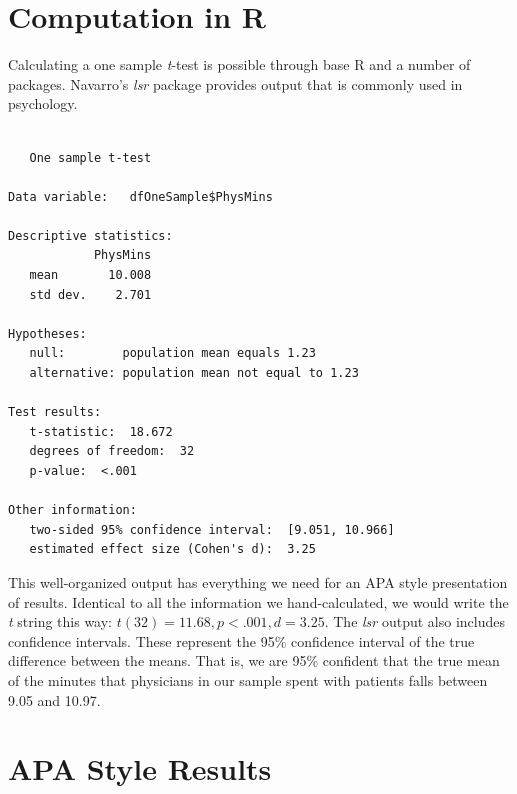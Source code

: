 \documentclass[
  11pt,
]{book}
\newenvironment{Shaded}{\begin{snugshade}}{\end{snugshade}}
\newcommand{\AttributeTok}[1]{\textcolor[rgb]{0.77,0.63,0.00}{#1}}
\newcommand{\FloatTok}[1]{\textcolor[rgb]{0.00,0.00,0.81}{#1}}
\newcommand{\FunctionTok}[1]{\textcolor[rgb]{0.00,0.00,0.00}{#1}}
\newcommand{\NormalTok}[1]{#1}
\newcommand{\SpecialCharTok}[1]{\textcolor[rgb]{0.00,0.00,0.00}{#1}}
\begin{document}
\hypertarget{computation-in-r}{%
\section{Computation in R}\label{computation-in-r}}

Calculating a one sample \emph{t}-test is possible through base R and a number of packages. Navarro's \citeyearpar{navarro_book_2020} \emph{lsr} package provides output that is commonly used in psychology.

\begin{Shaded}
\end{Shaded}

\begin{verbatim}

   One sample t-test 

Data variable:   dfOneSample$PhysMins 

Descriptive statistics: 
            PhysMins
   mean       10.008
   std dev.    2.701

Hypotheses: 
   null:        population mean equals 1.23 
   alternative: population mean not equal to 1.23 

Test results: 
   t-statistic:  18.672 
   degrees of freedom:  32 
   p-value:  <.001 

Other information: 
   two-sided 95% confidence interval:  [9.051, 10.966] 
   estimated effect size (Cohen's d):  3.25 
\end{verbatim}

This well-organized output has everything we need for an APA style presentation of results. Identical to all the information we hand-calculated, we would write the \emph{t} string this way: \(t(32) = 11.68, p < .001, d = 3.25\). The \emph{lsr} output also includes confidence intervals. These represent the 95\% confidence interval of the true difference between the means. That is, we are 95\% confident that the true mean of the minutes that physicians in our sample spent with patients falls between 9.05 and 10.97.

\hypertarget{apa-style-results}{%
\section{APA Style Results}\label{apa-style-results}}
\end{document}
